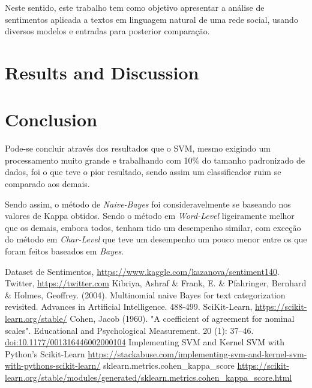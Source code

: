 \documentclass[conference]{IEEEtran}
\begin{document}
Neste sentido, este trabalho tem como objetivo apresentar a análise de
sentimentos aplicada a textos em linguagem natural de uma rede social, usando diversos modelos e entradas para posterior comparação.

\section{Results and Discussion}

\section{Conclusion}

Pode-se concluir através dos resultados que o SVM, mesmo exigindo um processamento muito grande e trabalhando com 10\% do tamanho padronizado de dados, foi o que teve o pior resultado, sendo assim um classificador ruim se comparado aos demais.

Sendo assim, o método de \textit{Naive-Bayes} foi consideravelmente se baseando nos valores de Kappa obtidos. Sendo o método em \textit{Word-Level} ligeiramente melhor que os demais, embora todos, tenham tido um desempenho similar, com exceção do método em \textit{Char-Level} que teve um desempenho um pouco menor entre os que foram feitos baseados em \textit{Bayes}.

\begin{thebibliography}{00}
 Dataset de Sentimentos, \url{https://www.kaggle.com/kazanova/sentiment140}.
 Twitter, \url{https://twitter.com}
 Kibriya, Ashraf \& Frank, E. \& Pfahringer, Bernhard \& Holmes, Geoffrey. (2004). Multinomial naive Bayes for text categorization revisited. Advances in Artificial Intelligence. 488-499. \label{kibriya}
 SciKit-Learn, \url{https://scikit-learn.org/stable/}
 Cohen, Jacob (1960). "A coefficient of agreement for nominal scales". Educational and Psychological Measurement. 20 (1): 37–46. \url{doi:10.1177/001316446002000104}
 Implementing SVM and Kernel SVM with Python's Scikit-Learn \url{https://stackabuse.com/implementing-svm-and-kernel-svm-with-pythons-scikit-learn/}
 sklearn.metrics.cohen\_kappa\_score \url{https://scikit-learn.org/stable/modules/generated/sklearn.metrics.cohen_kappa_score.html}

\end{thebibliography}
\end{document}
